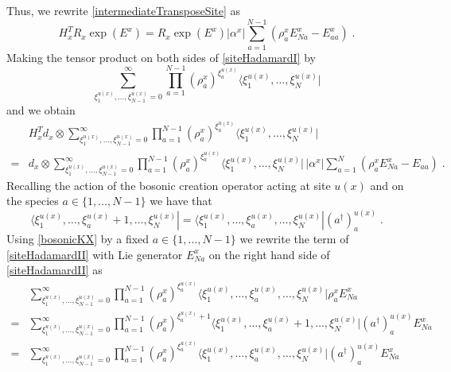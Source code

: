 \documentclass[10pt]{article}
\numberwithin{equation}{section}
\numberwithin{equation}{subsection}
\newcommand{\dt}{\;.}
\begin{document}
Thus, we rewrite \eqref{intermediateTransposeSite} as
\begin{equation}\label{siteHadamardI}
H_{x}^{T}R_{x}\exp{(E^{x})}=R_{x}\exp{(E^{x})}|\alpha^{x}|\sum_{a=1}^{N-1}\left(\rho_{a}^{x}E_{Na}^{x}-E_{aa}^{x}\right)\dt
\end{equation}
Making the tensor product on both sides of \eqref{siteHadamardI} by 
\begin{equation}
\sum_{\xi_{1}^{u(x)},\ldots,\xi_{N-1}^{u(x)}=0}^{\infty}\prod_{a=1}^{N-1}\left(\rho_{a}^{x}\right)^{\xi_{a}^{u(x)}}\langle \xi_{1}^{u(x)},\ldots,\xi_{N}^{u(x)}|
\end{equation}
and we obtain 
\begin{equation}\label{siteHadamardII}
    \begin{split}
&H_{x}^{T}d_{x}\otimes\sum_{\xi_{1}^{u(x)},\ldots,\xi_{N-1}^{u(x)}=0}^{\infty}\prod_{a=1}^{N-1}\left(\rho_{a}^{x}\right)^{\xi_{a}^{u(x)}}\langle \xi_{1}^{u(x)},\ldots,\xi_{N}^{u(x)}|
\\=&
d_{x}\otimes \sum_{\xi_{1}^{u(x)},\ldots,\xi_{N-1}^{u(x)}=0}^{\infty}\prod_{a=1}^{N-1}\left(\rho_{a}^{x}\right)^{\xi_{a}^{u(x)}}\langle \xi_{1}^{u(x)},\ldots,\xi_{N}^{u(x)}|\,|\alpha^{x}|\sum_{a=1}^{N}\left(\rho_{a}^{x}E_{Na}^{x}-E_{aa}\right)\dt
    \end{split}
\end{equation}
Recalling the action of the bosonic creation operator acting at site $u(x)$ and on the species $a\in \{1,\ldots,N-1\}$ we have that 
\begin{equation}\label{bosonicKX}
    \langle \xi_{1}^{u(x)},\ldots,\xi_{a}^{u(x)}+1,\ldots,\xi_{N}^{u(x)}|=  \langle \xi_{1}^{u(x)},\ldots,\xi_{a}^{u(x)},\ldots,\xi_{N}^{u(x)}|(a^{\dagger})^{u(x)}_{a}\dt
\end{equation}
Using \eqref{bosonicKX} by a fixed $a\in \{1,\ldots,N-1\}$ we rewrite the term of \eqref{siteHadamardII} with Lie generator $E_{Na}^{x}$ on the right hand side of \eqref{siteHadamardII} as 
\begin{equation}
    \begin{split}
&\sum_{\xi_{1}^{u(x)},\ldots,\xi_{N-1}^{u(x)}=0}^{\infty}\prod_{a=1}^{N-1}\left(\rho_{a}^{x}\right)^{\xi_{a}^{u(x)}}\langle \xi_{1}^{u(x)},\ldots,\xi_{a}^{u(x)},\ldots,\xi_{N}^{u(x)}|\rho_{a}^{x}E_{Na}^{x}
\\=&
\sum_{\xi_{1}^{u(x)},\ldots,\xi_{N-1}^{u(x)}=0}^{\infty}\prod_{a=1}^{N-1}\left(\rho_{a}^{x}\right)^{\xi_{a}^{u(x)}+1}\langle \xi_{1}^{u(x)},\ldots,\xi_{a}^{u(x)}+1,\ldots,\xi_{N}^{u(x)}|(a^{\dagger})_{a}^{u(x)}E_{Na}^{x}
\\=&
\sum_{\xi_{1}^{u(x)},\ldots,\xi_{N-1}^{u(x)}=0}^{\infty}\prod_{a=1}^{N-1}\left(\rho_{a}^{x}\right)^{\xi_{a}^{u(x)}}\langle \xi_{1}^{u(x)},\ldots,\xi_{a}^{u(x)},\ldots,\xi_{N}^{u(x)}|(a^{\dagger})_{a}^{u(x)}E_{Na}^{x}
    \end{split}
\end{equation}
\end{document}
